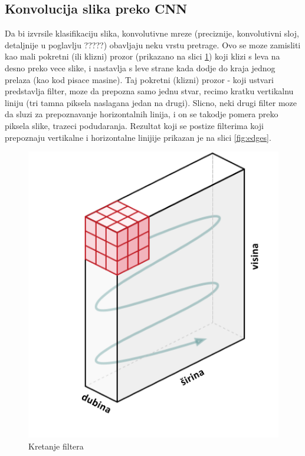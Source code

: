 \documentclass[a4paper]{article}
\begin{document}
\subsection{Konvolucija slika preko CNN}


Da bi izvrsile klasifikaciju slika, konvolutivne mreze (preciznije, konvolutivni sloj, detaljnije u poglavlju ?????) obavljaju neku vrstu pretrage. Ovo se moze zamisliti kao mali pokretni (ili klizni) prozor (prikazano na slici \ref{fig:filter_movement01}) koji klizi s leva na desno preko vece slike, i nastavlja s leve strane kada dodje do kraja jednog prelaza (kao kod pisace masine). Taj pokretni (klizni) prozor - koji ustvari predstavlja filter, moze da prepozna samo jednu stvar, recimo kratku vertikalnu liniju (tri tamna piksela naslagana jedan na drugi). Slicno, neki drugi filter moze da sluzi za prepoznavanje horizontalnih linija, i on se takodje pomera preko piksela slike, trazeci podudaranja. Rezultat koji se postize filterima koji prepoznaju vertikalne i horizontalne linijije prikazan je na slici \ref{fig:edges}.


\begin{figure}[h!]
\begin{center}
\includegraphics[scale=0.4]{filter_movement01.jpg}
\end{center}
\caption{Kretanje filtera}
\label{fig:filter_movement01}
\end{figure}
\end{document}
